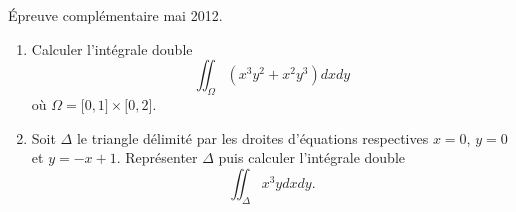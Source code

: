 
\begin{exercice}\label{exoOutilsMath-0144} Épreuve complémentaire mai 2012.\\

    \begin{enumerate}
        \item
            Calculer l'intégrale double
            \begin{equation}
                \iint_{\Omega}(x^3y^2+x^2y^3)dxdy
            \end{equation}
            où \( \Omega=\mathopen[ 0 , 1 \mathclose]\times \mathopen[ 0 , 2 \mathclose]\).
        \item
            Soit \( \Delta\) le triangle délimité par les droites d'équations respectives \( x=0\), \( y=0\) et \( y=-x+1\). Représenter \( \Delta\) puis calculer l'intégrale double
            \begin{equation}
                \iint_{\Delta}x^3ydxdy.
            \end{equation}
            
    \end{enumerate}
    

\end{exercice}
